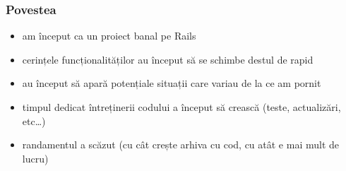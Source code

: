 \documentclass[compress]{beamer}
\begin{document}
\begin{frame}
\frametitle{Povestea}

\begin{itemize}[<+->]
  \item am început ca un proiect banal pe Rails
  \item cerințele funcționalităților au început să se schimbe destul de rapid
  \item au început să apară potențiale situații care variau de la ce am pornit
  \item timpul dedicat întreținerii codului a început să crească (teste, actualizări, etc\ldots)
  \item randamentul a scăzut (cu cât crește arhiva cu cod, cu atât e mai mult de lucru)
\end{itemize}
\end{frame}
\end{document}
